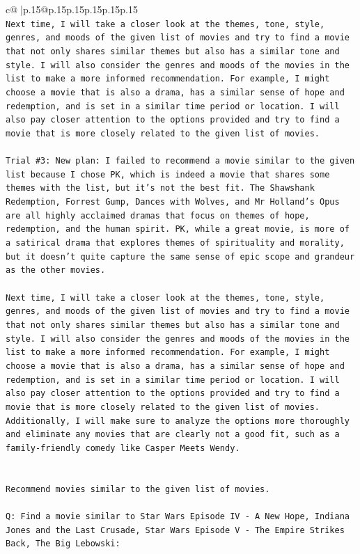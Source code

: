 \documentclass{article}
\begin{document}
{\begin{supertabular}{c@{$\;$}|p{.15\linewidth}@{}p{.15\linewidth}p{.15\linewidth}p{.15\linewidth}p{.15\linewidth}p{.15\linewidth}}
{{{\\ 
\texttt{Next time, I will take a closer look at the themes, tone, style, genres, and moods of the given list of movies and try to find a movie that not only shares similar themes but also has a similar tone and style. I will also consider the genres and moods of the movies in the list to make a more informed recommendation. For example, I might choose a movie that is also a drama, has a similar sense of hope and redemption, and is set in a similar time period or location. I will also pay closer attention to the options provided and try to find a movie that is more closely related to the given list of movies.} \\
\\ 
\texttt{Trial \#3: New plan: I failed to recommend a movie similar to the given list because I chose PK, which is indeed a movie that shares some themes with the list, but it's not the best fit. The Shawshank Redemption, Forrest Gump, Dances with Wolves, and Mr Holland's Opus are all highly acclaimed dramas that focus on themes of hope, redemption, and the human spirit. PK, while a great movie, is more of a satirical drama that explores themes of spirituality and morality, but it doesn't quite capture the same sense of epic scope and grandeur as the other movies.} \\
\\ 
\texttt{Next time, I will take a closer look at the themes, tone, style, genres, and moods of the given list of movies and try to find a movie that not only shares similar themes but also has a similar tone and style. I will also consider the genres and moods of the movies in the list to make a more informed recommendation. For example, I might choose a movie that is also a drama, has a similar sense of hope and redemption, and is set in a similar time period or location. I will also pay closer attention to the options provided and try to find a movie that is more closely related to the given list of movies. Additionally, I will make sure to analyze the options more thoroughly and eliminate any movies that are clearly not a good fit, such as a family{-}friendly comedy like Casper Meets Wendy.} \\
\\ 
\\ 
\texttt{Recommend movies similar to the given list of movies.} \\
\\ 
\texttt{Q: Find a movie similar to Star Wars Episode IV {-} A New Hope, Indiana Jones and the Last Crusade, Star Wars Episode V {-} The Empire Strikes Back, The Big Lebowski:} \\
}}}
\end{supertabular}}
\end{document}
